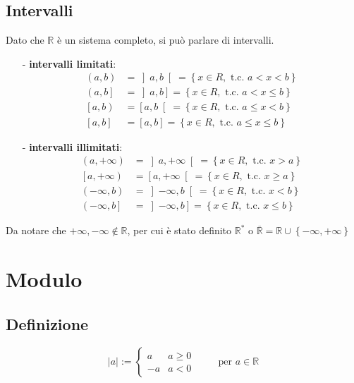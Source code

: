\documentclass[a4paper]{article}
\begin{document}
\subsection{Intervalli}
Dato che \(\mathbb{R}\) è un sistema completo, si può parlare di intervalli.
\begin{itemize}
	\item[-] \textbf{intervalli limitati}:
	\begin{align*}
		\left(a, b \right) &= \left]a, b \right[ = \left\{x \in R, \text{ t.c. } a < x < b \right\} \\
		\left(a, b \right] &= \left]a, b \right] = \left\{x \in R, \text{ t.c. } a < x \leq b \right\} \\
		\left[a, b \right) &= \left[a, b \right[ = \left\{x \in R, \text{ t.c. } a \leq x < b \right\} \\
		\left[a, b \right] &= \left[a, b \right] = \left\{x \in R, \text{ t.c. } a \leq x \leq b \right\}
	\end{align*}
	\item[-] \textbf{intervalli illimitati}:
	\begin{align*}
		\left(a, +\infty \right) &= \left] a, +\infty \right[ = \left\{x \in R, \text{ t.c. } x > a \right\} \\
		\left[a, +\infty \right) &= \left[ a, +\infty \right[ = \left\{x \in R, \text{ t.c. } x \geq a \right\} \\
		\left(-\infty, b \right) &= \left] -\infty, b \right[ = \left\{x \in R, \text{ t.c. } x < b \right\} \\
		\left(-\infty, b \right] &= \left] -\infty, b \right] = \left\{x \in R, \text{ t.c. } x \leq b \right\}
	\end{align*}
\end{itemize}
Da notare che \(+\infty, -\infty \notin \mathbb{R}\), per cui è stato definito \(\mathbb{R}^*\) o \(\overline{\mathbb{R}} = \mathbb{R} \cup \left\{ -\infty, +\infty \right\}\)

\newpage


\section{Modulo}
\subsection{Definizione}
\begin{equation*}
	\left| a \right| :=
	\begin{cases}
		a & a \geq 0 \\
		-a & a < 0
	\end{cases}
	\qquad \text{ per } a \in \mathbb{R}
\end{equation*}
\end{document}
